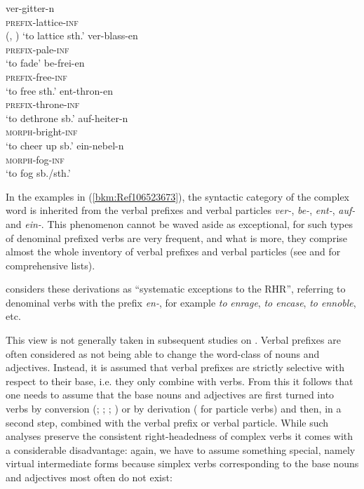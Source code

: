 \documentclass[output=paper
  ,nobabel
  ,draftmode
  ,colorlinks, citecolor=brown
]{langscibook}
\begin{document}
\eal
\label{bkm:Ref106523673}
\ex
\gll ver-gitter-n\\
       \textsc{prefix}{}-lattice-\textsc{inf} \\\hfill(, \citealt[215, 216]{Elsen2014})
\glt   `to lattice sth.'
\ex
\gll ver-blass-en\\
       \textsc{prefix}{}-pale-\textsc{inf} \\
\glt   `to fade'
\ex
\gll be-frei-en\\
     \textsc{prefix}{}-free-\textsc{inf} \\
\glt   `to free sth.'
\ex
\gll ent-thron-en\\
       \textsc{prefix}{}-throne-\textsc{inf} \\
\glt   `to dethrone sb.'
\ex
\gll auf-heiter-n\\
       \textsc{morph}{}-bright-\textsc{inf} \\
\glt   `to cheer up sb.'
\ex
\gll ein-nebel-n\\
       \textsc{morph}{}-fog-\textsc{inf} \\
\glt   `to fog sb./sth.'
\zl

\noindent
In the examples in (\ref{bkm:Ref106523673}), the syntactic category of the complex word is inherited
from the verbal prefixes and verbal particles \emph{ver-}, \emph{be-}, \emph{ent-}, \emph{auf-} and
\emph{ein-}. This phenomenon cannot be waved aside as exceptional, for such types of denominal
prefixed verbs are very frequent, and what is more, they comprise almost the whole inventory of
 verbal prefixes and verbal particles (see \citealt[Sections~5.2--5.3]{FleischerBarz2012} and
\citealt[215--222]{Elsen2014} for comprehensive lists).

\citet[250]{Williams1981} considers these derivations as ``systematic exceptions to the RHR'',
referring to  denominal verbs with the prefix \emph{en-}, for example \emph{to}
\emph{enrage}, \emph{to encase}, \emph{to ennoble}, etc.

This view is not generally taken in subsequent studies on . Verbal prefixes are often
considered as not being able to change the word-class of nouns and adjectives. Instead, it is
assumed that verbal prefixes are strictly selective with respect to their base, i.e. they only
combine with verbs. From this it follows that one needs to assume that the base nouns and adjectives
are first turned into verbs by conversion (\citealt{Olsen1990a}; \citealt[49--50,
275--277]{Lohde2006}; \citealt[27--28]{Fortmann2007a}; \citealt[145--149]{Michel2014}) or by
derivation (\citealt[284]{Mueller2003a} for particle verbs) and then, in a second step, combined with
the verbal prefix or verbal particle. While such analyses preserve the consistent right-headedness
of complex verbs it comes with a considerable disadvantage: again, we have to assume something
special, namely virtual intermediate forms because simplex verbs corresponding to the base nouns and
adjectives most often do not exist:
\end{document}
